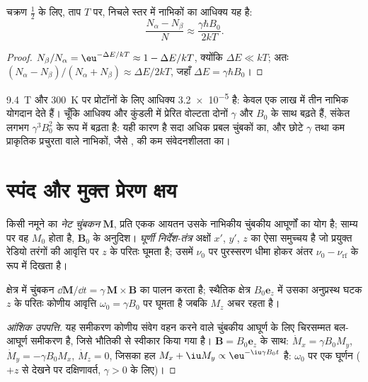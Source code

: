 \begin{proposition}[समष्टि का अति सूक्ष्म अंतर]\label{prop:b3:advanced-nmr:populations}
चक्रण $\frac12$ के लिए, ताप $T$ पर, निचले स्तर में नाभिकों का आधिक्य यह है:
\[
\frac{N_\alpha - N_\beta}{N} \approx \frac{\gamma\hbar B_0}{2kT}.
\]
\end{proposition}

\begin{proof}
$N_\beta/N_\alpha = \eu^{-\Delta E/kT} \approx 1 - \Delta E/kT$, क्योंकि $\Delta E \ll kT$; अतः
$(N_\alpha - N_\beta)/(N_\alpha + N_\beta) \approx \Delta E/2kT$, जहाँ $\Delta E = \gamma\hbar B_0$।
\end{proof}

\qty{9.4}{T} और \qty{300}{K} पर प्रोटॉनों के लिए आधिक्य \num{3.2e-5} है: केवल
एक लाख में तीन नाभिक योगदान देते हैं। चूँकि आधिक्य और
कुंडली में प्रेरित वोल्टता दोनों $\gamma$ और $B_0$ के साथ बढ़ते हैं, संकेत
लगभग $\gamma^3B_0^2$ के रूप में बढ़ता है: यही कारण है सदा अधिक प्रबल चुंबकों का, और
छोटे $\gamma$ तथा कम प्राकृतिक प्रचुरता वाले नाभिकों, जैसे
, की कम संवेदनशीलता का।

\section{स्पंद और मुक्त प्रेरण क्षय}

\begin{definition}[नेट चुंबकन, घूर्णी निर्देश-तंत्र]\label{def:b3:advanced-nmr:magnetisation}
किसी नमूने का \emph{नेट चुंबकन} $\mathbf M$, प्रति एकक आयतन
उसके नाभिकीय चुंबकीय आघूर्णों का योग है; साम्य पर वह
$M_0$ होता है, $\mathbf B_0$ के अनुदिश। \emph{घूर्णी निर्देश-तंत्र}
अक्षों $x'$, $y'$, $z$ का ऐसा समुच्चय है जो प्रयुक्त रेडियो तरंगों की आवृत्ति पर $z$ के
परितः घूमता है; उसमें $\nu_0$ पर पुरस्सरण धीमा होकर अंतर $\nu_0 -
\nu_{\mathrm{rf}}$ के रूप में दिखता है।
\end{definition}

\begin{proposition}[पुरस्सरण]\label{prop:b3:advanced-nmr:precession}
क्षेत्र में चुंबकन $\dd\mathbf M/\dd t = \gamma\,\mathbf M\times\mathbf B$ का पालन करता है;
स्थैतिक क्षेत्र $B_0\mathbf e_z$ में उसका अनुप्रस्थ घटक $z$ के परितः कोणीय
आवृत्ति $\omega_0 = \gamma B_0$ पर घूमता है जबकि $M_z$ अचर रहता है।
\end{proposition}

\begin{proof}[आंशिक उपपत्ति]
यह समीकरण कोणीय संवेग वहन करने वाले चुंबकीय आघूर्ण के लिए चिरसम्मत बल-आघूर्ण
समीकरण है, जिसे भौतिकी से स्वीकार किया गया है। $\mathbf B = B_0\mathbf e_z$ के साथ: $\dot M_x = \gamma
B_0M_y$, $\dot M_y = -\gamma B_0M_x$, $\dot M_z = 0$, जिसका हल $M_x + \iu M_y \propto
\eu^{-\iu\gamma B_0t}$ है: $\omega_0$ पर एक घूर्णन ($+z$ से देखने पर दक्षिणावर्त, $\gamma > 0$ के लिए)।
\end{proof}

